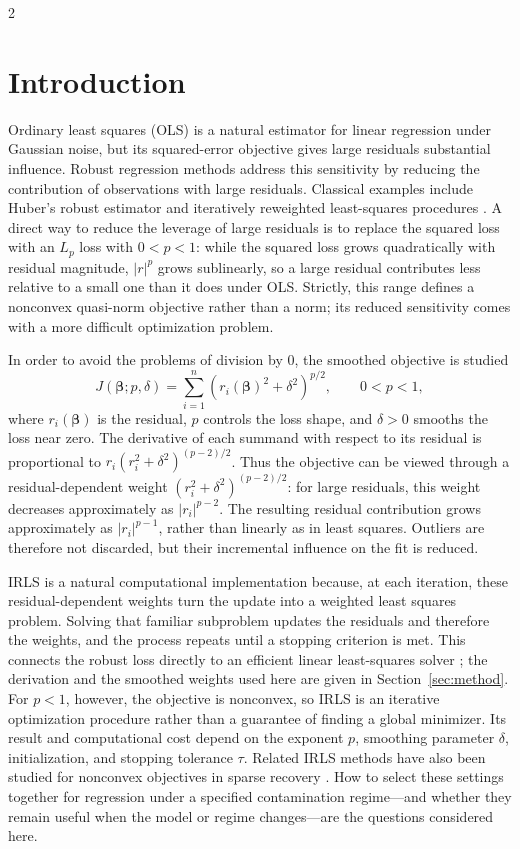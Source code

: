 \documentclass[10pt,a4paper]{article}
\begin{document}
\begin{multicols}{2}

\section{Introduction}
\label{sec:intro}

Ordinary least squares (OLS) is a natural estimator for linear regression
under Gaussian noise, but its squared-error objective gives large residuals
substantial influence. Robust regression methods address this sensitivity by
reducing the contribution of observations with large residuals. Classical
examples include Huber's robust estimator and iteratively reweighted
least-squares procedures \cite{huber1964, hollandwelsch1977}. A direct way to
reduce the leverage of large residuals is to replace the squared loss with an
$L_p$ loss with $0<p<1$: while the squared loss grows quadratically with
residual magnitude, $|r|^p$ grows sublinearly, so a large residual contributes 
less relative to a small one than it does under OLS. Strictly, this range
defines a nonconvex quasi-norm objective rather than a norm; its reduced
sensitivity comes with a more difficult optimization problem.

In order to avoid the problems of division by 0, the smoothed objective is studied
\[
  J(\boldsymbol{\beta};p,\delta)
  = \sum_{i=1}^{n}
    \left(r_i(\boldsymbol{\beta})^2+\delta^2\right)^{p/2},
  \qquad 0<p<1,
\]
where $r_i(\boldsymbol{\beta})$ is the residual, $p$ controls the loss shape,
and $\delta>0$ smooths the loss near zero. The derivative of each summand
with respect to its residual is proportional to
$r_i(r_i^2+\delta^2)^{(p-2)/2}$. Thus the objective can be viewed through a
residual-dependent weight $(r_i^2+\delta^2)^{(p-2)/2}$: for large residuals,
this weight decreases approximately as $|r_i|^{p-2}$. The resulting
residual contribution grows approximately as $|r_i|^{p-1}$, rather than
linearly as in least squares. Outliers are therefore not discarded, but
their incremental influence on the fit is reduced.

IRLS is a natural computational implementation because, at each iteration,
these residual-dependent weights turn the update into a weighted least
squares problem. Solving that familiar subproblem updates the residuals and
therefore the weights, and the process repeats until a stopping criterion is
met. This connects the robust loss directly to an efficient linear
least-squares solver \cite{hollandwelsch1977}; the derivation and the
smoothed weights used here are given in Section~\ref{sec:method}. For
$p<1$, however, the objective is nonconvex, so IRLS is an iterative
optimization procedure rather than a guarantee of finding a global
minimizer. Its result and computational cost depend on the exponent $p$,
smoothing parameter $\delta$, initialization, and stopping tolerance
$\tau$. Related IRLS methods have also been studied for nonconvex objectives
in sparse recovery \cite{daubechies2010}. How to select these settings
together for regression under a specified contamination regime—and whether
they remain useful when the model or regime changes—are the questions
considered here.


\end{multicols}
\end{document}
